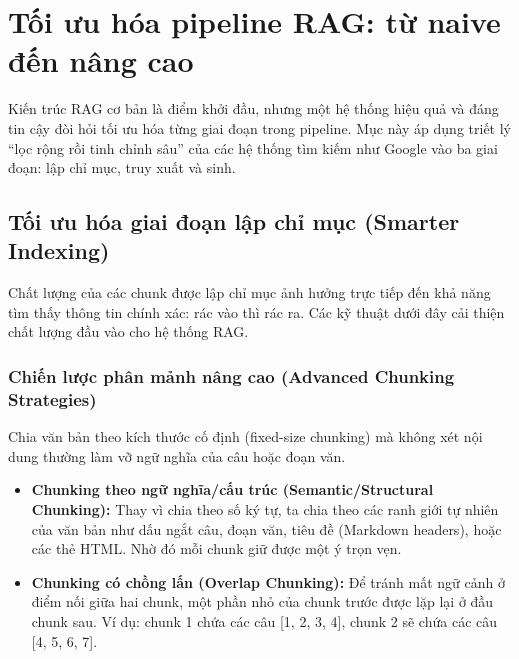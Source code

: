 
\section{Tối ưu hóa pipeline RAG: từ naive đến nâng cao}
\label{sec:advanced_rag_pipeline}

Kiến trúc RAG cơ bản là điểm khởi đầu, nhưng một hệ thống hiệu quả và đáng tin cậy đòi hỏi tối ưu hóa từng giai đoạn trong pipeline. Mục này áp dụng triết lý “lọc rộng rồi tinh chỉnh sâu” của các hệ thống tìm kiếm như Google vào ba giai đoạn: lập chỉ mục, truy xuất và sinh.

\subsection{Tối ưu hóa giai đoạn lập chỉ mục (Smarter Indexing)}
\label{ssec:smarter_indexing}
Chất lượng của các chunk được lập chỉ mục ảnh hưởng trực tiếp đến khả năng tìm thấy thông tin chính xác: rác vào thì rác ra. Các kỹ thuật dưới đây cải thiện chất lượng đầu vào cho hệ thống RAG.

\subsubsection{Chiến lược phân mảnh nâng cao (Advanced Chunking Strategies)}
Chia văn bản theo kích thước cố định (fixed-size chunking) mà không xét nội dung thường làm vỡ ngữ nghĩa của câu hoặc đoạn văn.
\begin{itemize}
	\item \textbf{Chunking theo ngữ nghĩa/cấu trúc (Semantic/Structural Chunking):} Thay vì chia theo số ký tự, ta chia theo các ranh giới tự nhiên của văn bản như dấu ngắt câu, đoạn văn, tiêu đề (Markdown headers), hoặc các thẻ HTML. Nhờ đó mỗi chunk giữ được một ý trọn vẹn.
	\item \textbf{Chunking có chồng lấn (Overlap Chunking):} Để tránh mất ngữ cảnh ở điểm nối giữa hai chunk, một phần nhỏ của chunk trước được lặp lại ở đầu chunk sau. Ví dụ: chunk 1 chứa các câu [1, 2, 3, 4], chunk 2 sẽ chứa các câu [4, 5, 6, 7].
\end{itemize}

